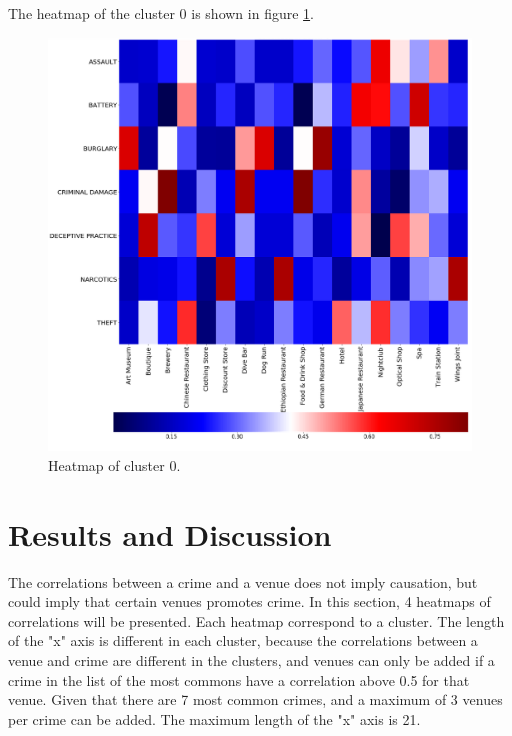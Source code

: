 \documentclass[a4paper,12pt]{article}
\begin{document}
The heatmap of the cluster 0 is shown in figure \ref{fig:cluster_0}.
\begin{figure}[hb]
 \centering
\includegraphics[scale=0.65]{Heatmap_cluster_0}
\caption{Heatmap of cluster 0. 
\label{fig:cluster_0}}
\end{figure}

\section{Results and Discussion}
The correlations between a crime and a venue does not imply causation, but could imply that certain venues promotes crime. In this section, 4 heatmaps of correlations will be presented. Each heatmap correspond to a cluster. The length of the "x" axis is different in each cluster, because the correlations between a venue and crime are different in the clusters, and venues can only be added if a crime in the list of the most commons have a correlation above 0.5 for that venue. Given that there are 7 most common crimes, and a maximum of 3 venues per crime can be added. The maximum length of the "x" axis is 21.
\end{document}
